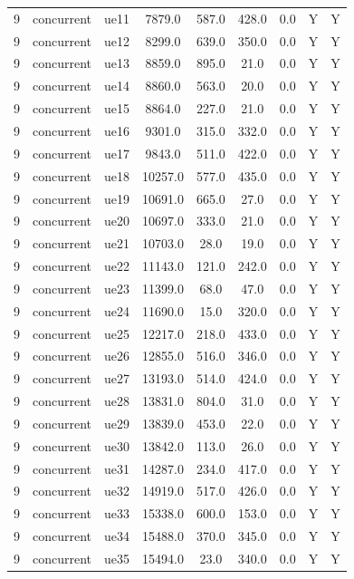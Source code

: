 \begin{table}[ht]
\begin{tabular}{|c|c|c|c|c|c|c|c|c|}
9 & concurrent & ue11 & 7879.0 & 587.0 & 428.0 & 0.0 & Y & Y \\
9 & concurrent & ue12 & 8299.0 & 639.0 & 350.0 & 0.0 & Y & Y \\
9 & concurrent & ue13 & 8859.0 & 895.0 & 21.0 & 0.0 & Y & Y \\
9 & concurrent & ue14 & 8860.0 & 563.0 & 20.0 & 0.0 & Y & Y \\
9 & concurrent & ue15 & 8864.0 & 227.0 & 21.0 & 0.0 & Y & Y \\
9 & concurrent & ue16 & 9301.0 & 315.0 & 332.0 & 0.0 & Y & Y \\
9 & concurrent & ue17 & 9843.0 & 511.0 & 422.0 & 0.0 & Y & Y \\
9 & concurrent & ue18 & 10257.0 & 577.0 & 435.0 & 0.0 & Y & Y \\
9 & concurrent & ue19 & 10691.0 & 665.0 & 27.0 & 0.0 & Y & Y \\
9 & concurrent & ue20 & 10697.0 & 333.0 & 21.0 & 0.0 & Y & Y \\
9 & concurrent & ue21 & 10703.0 & 28.0 & 19.0 & 0.0 & Y & Y \\
9 & concurrent & ue22 & 11143.0 & 121.0 & 242.0 & 0.0 & Y & Y \\
9 & concurrent & ue23 & 11399.0 & 68.0 & 47.0 & 0.0 & Y & Y \\
9 & concurrent & ue24 & 11690.0 & 15.0 & 320.0 & 0.0 & Y & Y \\
9 & concurrent & ue25 & 12217.0 & 218.0 & 433.0 & 0.0 & Y & Y \\
9 & concurrent & ue26 & 12855.0 & 516.0 & 346.0 & 0.0 & Y & Y \\
9 & concurrent & ue27 & 13193.0 & 514.0 & 424.0 & 0.0 & Y & Y \\
9 & concurrent & ue28 & 13831.0 & 804.0 & 31.0 & 0.0 & Y & Y \\
9 & concurrent & ue29 & 13839.0 & 453.0 & 22.0 & 0.0 & Y & Y \\
9 & concurrent & ue30 & 13842.0 & 113.0 & 26.0 & 0.0 & Y & Y \\
9 & concurrent & ue31 & 14287.0 & 234.0 & 417.0 & 0.0 & Y & Y \\
9 & concurrent & ue32 & 14919.0 & 517.0 & 426.0 & 0.0 & Y & Y \\
9 & concurrent & ue33 & 15338.0 & 600.0 & 153.0 & 0.0 & Y & Y \\
9 & concurrent & ue34 & 15488.0 & 370.0 & 345.0 & 0.0 & Y & Y \\
9 & concurrent & ue35 & 15494.0 & 23.0 & 340.0 & 0.0 & Y & Y \\

\end{tabular}
\end{table}
